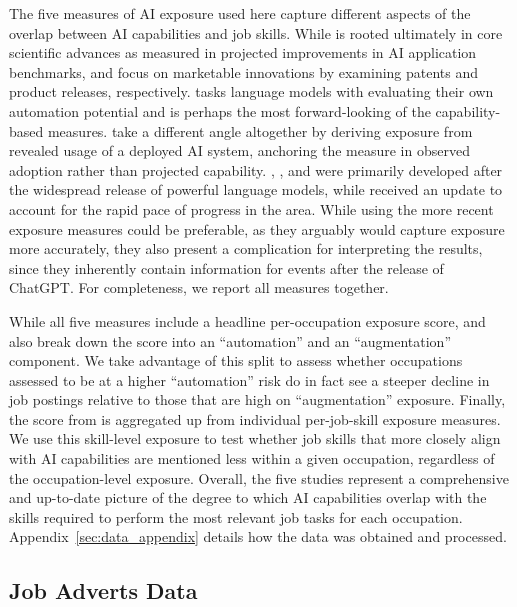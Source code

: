 \documentclass[11pt]{article}
\begin{document}
The five measures of AI exposure used here capture different aspects of the overlap between AI capabilities and job skills. While \citet{felten_method_2018} is rooted ultimately in core scientific advances as measured in projected improvements in AI application benchmarks, \citet{webb_impact_2022} and \citet{demirev2024assessing} focus on marketable innovations by examining patents and product releases, respectively. \citet{eloundou_gpts_2023} tasks language models with evaluating their own automation potential and is perhaps the most forward-looking of the capability-based measures. \citet{handa2025economic} take a different angle altogether by deriving exposure from revealed usage of a deployed AI system, anchoring the measure in observed adoption rather than projected capability. \citet{eloundou_gpts_2023}, \cite{demirev2024assessing}, and \cite{handa2025economic} were primarily developed after the widespread release of powerful language models, while \citet{felten_method_2018} received an update \cite{felten_how_2023} to account for the rapid pace of progress in the area. While using the more recent exposure measures could be preferable, as they arguably would capture exposure more accurately, they also present a complication for interpreting the results, since they inherently contain information for events after the release of ChatGPT. For completeness, we report all measures together. 

While all five measures include a headline per-occupation exposure score, \citet{demirev2024assessing} and \citet{handa2025economic} also break down the score into an ``automation'' and an ``augmentation'' component. We take advantage of this split to assess whether occupations assessed to be at a higher ``automation'' risk do in fact see a steeper decline in job postings relative to those that are high on ``augmentation'' exposure. Finally, the score from \citet{demirev2024assessing} is aggregated up from individual per-job-skill exposure measures. We use this skill-level exposure to test whether job skills that more closely align with AI capabilities are mentioned less within a given occupation, regardless of the occupation-level exposure. Overall, the five studies represent a comprehensive and up-to-date picture of the degree to which AI capabilities overlap with the skills required to perform the most relevant job tasks for each occupation. Appendix~\ref{sec:data_appendix} details how the data was obtained and processed. 

\subsection{Job Adverts Data}
\end{document}
